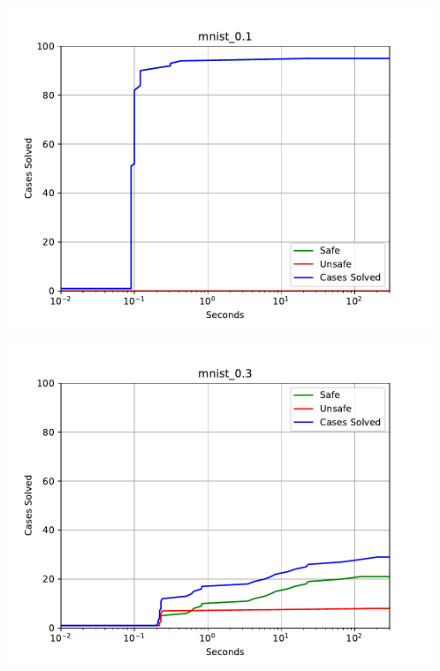 \begin{figure}[!ht]
\center
\includegraphics[scale=0.8]{figures/mnist_0.1.pdf}
\end{figure}

\begin{figure}[!ht]
\center
\includegraphics[scale=0.8]{figures/mnist_0.3.pdf}
\end{figure}

